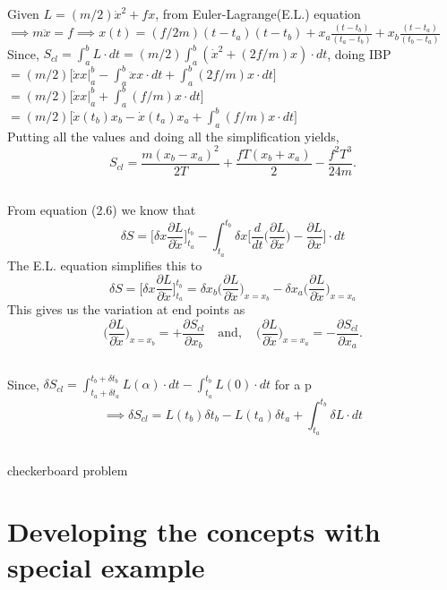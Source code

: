 \documentclass[a4paper, 12pt]{article}
\begin{document}
\subsection {}%
Given $L = (m/2)\dot{x}^2 + fx$, from Euler-Lagrange(E.L.) equation \\
$\implies m\ddot{x}=f \implies x(t)=(f/2m)(t-t_a)(t-t_b)+x_a \frac{(t-t_b)}{(t_a-t_b)}+x_b \frac{(t-t_a)}{(t_b-t_a)}$\\
Since, $S_{cl}=\int_{a}^{b} L \cdot dt =(m/2) \int_{a}^{b}(\dot{x}^2 +(2f/m)x)\cdot dt$, doing IBP\\
$=(m/2) \Big[ \dot{x}x|_a^b -\int_{a}^{b}\ddot{x}x \cdot dt +\int_{a}^{b}(2f/m)x \cdot dt \Big]$\\
$=(m/2) \Big[ \dot{x}x|_a^b  +\int_{a}^{b}(f/m)x \cdot dt \Big]$\\
$=(m/2)\Big[\dot{x}(t_b)x_b - \dot{x}(t_a)x_a+\int_{a}^{b}(f/m)x \cdot dt\Big]$\\
Putting all the values and doing all the simplification yields,\\
$$ S_{cl} =\frac{m(x_b-x_a)^2}{2T}+\frac{fT(x_b+x_a)}{2}-\frac{f^2T^3}{24m}.$$

\subsection {}%
From equation (2.6) we know that
$$\delta S = \bigg[\delta x\frac{\partial L}{\partial \dot{x}}\bigg]_{t_a}^{t_b}-\int_{t_a}^{t_b}\delta x \bigg[\frac{d}{dt}\bigg(\frac{\partial L}{\partial \dot{x}}\bigg) - \frac{\partial L}{\partial x}  \bigg]\cdot dt$$
 The E.L. equation simplifies this to\\
 $$\delta S = \bigg[\delta x\frac{\partial L}{\partial \dot{x}}\bigg]_{t_a}^{t_b} = \delta x_b\bigg(\frac{\partial L}{\partial \dot{x}}\bigg)_{x=x_b}- \delta x_a\bigg(\frac{\partial L}{\partial \dot{x}}\bigg)_{x=x_a}$$
This gives us the variation at end points as\\
$$\bigg(\frac{\partial L}{\partial \dot{x}}\bigg)_{x=x_b} =+\frac{\partial S_{cl}}{\partial x_b}\quad \mathrm{and,}\quad
\bigg(\frac{\partial L}{\partial \dot{x}}\bigg)_{x=x_a} =-\frac{\partial S_{cl}}{\partial x_a}.$$

\subsection {}%
Since, $\delta S_{cl}=\int_{t_a+\delta t_a}^{t_b+\delta t_b} L(\alpha) \cdot dt - \int_{t_a}^{t_b} L(0) \cdot dt$ for a p
$$\implies \delta S_{cl}= L(t_b)\delta t_b -L(t_a)\delta t_a +\int_{t_a}^{t_b} \delta L \cdot dt$$%

\subsection {}%
checkerboard problem



\section {{\large{\textbf{Developing the concepts with special example}}}}

\subsection {}%
\end{document}
